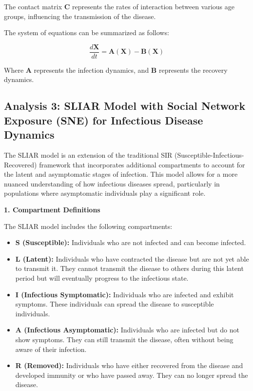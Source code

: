 \documentclass[9 pt]{article} %
\begin{document}
The contact matrix \( \mathbf{C} \) represents the rates of interaction between various age groups, influencing the transmission of the disease.

The system of equations can be summarized as follows:

\[
\frac{d\mathbf{X}}{dt} = \mathbf{A}(\mathbf{X}) - \mathbf{B}(\mathbf{X})
\]

Where \( \mathbf{A} \) represents the infection dynamics, and \( \mathbf{B} \) represents the recovery dynamics.


\subsection{Analysis 3: SLIAR Model with Social Network Exposure (SNE) for Infectious Disease Dynamics}

The SLIAR model \cite{ajelli2010sliar} is an extension of the traditional SIR (Susceptible-Infectious-Recovered) framework that incorporates additional compartments to account for the latent and asymptomatic stages of infection. This model allows for a more nuanced understanding of how infectious diseases spread, particularly in populations where asymptomatic individuals play a significant role.

\textbf{1. Compartment Definitions}

The SLIAR model includes the following compartments:

\begin{itemize}
    \item \textbf{S (Susceptible):} Individuals who are not infected and can become infected.
    \item \textbf{L (Latent):} Individuals who have contracted the disease but are not yet able to transmit it. They cannot transmit the disease to others during this latent period but will eventually progress to the infectious state.
    \item \textbf{I (Infectious Symptomatic):} Individuals who are infected and exhibit symptoms. These individuals can spread the disease to susceptible individuals.
    \item \textbf{A (Infectious Asymptomatic):} Individuals who are infected but do not show symptoms. They can still transmit the disease, often without being aware of their infection.
    \item \textbf{R (Removed):} Individuals who have either recovered from the disease and developed immunity or who have passed away. They can no longer spread the disease.
\end{itemize}
\end{document}
